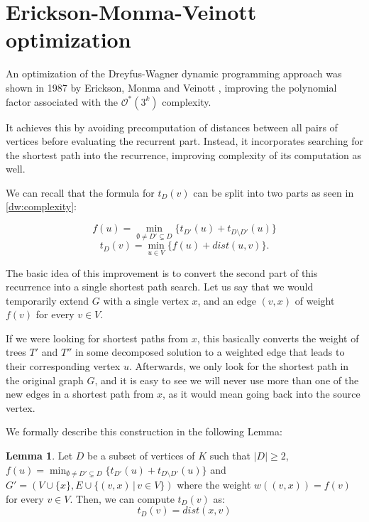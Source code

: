 \documentclass[thesis=M,english,hidelinks]{FITthesis}[2012/10/20]
\theoremstyle{definition}
\newtheorem{lemma}{Lemma}
\begin{document}
\section{Erickson-Monma-Veinott optimization}

An optimization of the Dreyfus-Wagner dynamic programming approach was shown in 1987 by Erickson, Monma and Veinott
\cite{Erickson1987}, improving the polynomial factor associated with the $\mathcal{O}^*(3^k)$ complexity.

It achieves this by avoiding precomputation of distances between all pairs of vertices before evaluating the recurrent
part. Instead, it incorporates searching for the shortest path into the recurrence, improving complexity of its
computation as well.

We can recall that the formula for $t_D(v)$ can be split into two parts as seen in \autoref{dw:complexity}:

$$
f(u) = \min_{\emptyset \neq D' \subsetneq D} \{ t_{D'}(u) + t_{D \setminus D'}(u) \}
$$
$$
t_D(v) = \min_{u \in V} \{ f(u) + dist(u, v) \}.
$$

The basic idea of this improvement is to convert the second part of this recurrence into a single shortest path search.
Let us say that we would temporarily extend $G$ with a single vertex $x$, and an edge $(v, x)$ of weight $f(v)$ for every
$v \in V$.

If we were looking for shortest paths from $x$, this basically converts the weight of trees $T'$ and $T''$ in
some decomposed solution to a weighted edge that leads to their corresponding vertex $u$. Afterwards, we only look for
the shortest path in the original graph $G$, and it is easy to see we will never use more than one of the new edges
in a shortest path from $x$, as it would mean going back into the source vertex.

We formally describe this construction in the following Lemma:

\begin{lemma}
    \label{emv:formula}
    Let $D$ be a subset of vertices of $K$ such that $|D| \geq 2$, $f(u) = \min_{\emptyset \neq D' \subsetneq D} \{ t_{D'}(u) + t_{D
    \setminus D'}(u) \}$ and $G' = (V \cup \{ x \}, E \cup \{ (v, x)\,|\,v \in V \})$ where the weight $w((v, x)) =
    f(v)$ for every $v \in V$. Then, we can compute $t_D(v)$ as:
    $$
    t_D(v) = dist(x, v)
    $$
\end{lemma}
\end{document}
